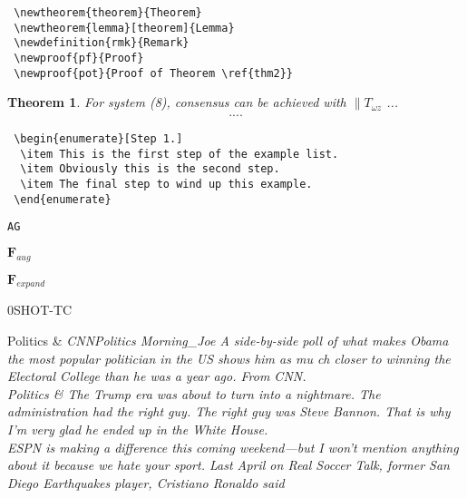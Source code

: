 \begin{verbatim}
 \newtheorem{theorem}{Theorem}
 \newtheorem{lemma}[theorem]{Lemma}
 \newdefinition{rmk}{Remark}
 \newproof{pf}{Proof}
 \newproof{pot}{Proof of Theorem \ref{thm2}}
\end{verbatim}


\newtheorem{theorem}{Theorem}

\begin{theorem}
For system (8), consensus can be achieved with 
$\|T_{\omega z}$ ...
\begin{eqnarray}\label{10}
....
\end{eqnarray}
\end{theorem}


\begin{verbatim}
 \begin{enumerate}[Step 1.]
  \item This is the first step of the example list.
  \item Obviously this is the second step.
  \item The final step to wind up this example.
 \end{enumerate}
\end{verbatim}





{\verb|AG|}


$\mathbf{F}_{aug}$

$\mathbf{F}_{expand}$


\textsc{0SHOT-TC}



{Politics} &  \itshape{CNNPolitics Morning_Joe A side-by-side poll of what makes Obama the most popular politician in the US shows him as mu
ch closer to winning the Electoral College than he was a year ago. From CNN.} \\
{Politics}  & \itshape{The Trump era was about to turn into a nightmare. The administration had the right guy. The right guy was Steve Bannon. That is why I'm very glad he ended up in the White House.} \\


ESPN is making a difference this coming weekend—but I won't mention anything about it because we hate your sport. Last April on Real Soccer Talk, former San Diego Earthquakes player, Cristiano Ronaldo said




\toprule

\midrule 

\midrule
\bottomrule

